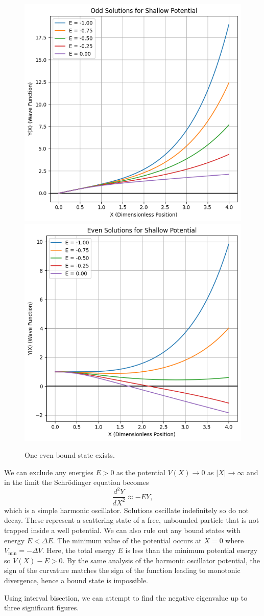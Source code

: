 \documentclass{article}
\begin{document}
\begin{figure}
    \centering
    \includegraphics[width=0.49\linewidth]{images/old_shallow.png}
    \includegraphics[width=0.49\linewidth]{images/even_shallow.png}
    \caption{One even bound state exists.}
\end{figure}

 We can exclude any energies \(E > 0\) as the potential \(V(X) \to 0\) as \(|X| \to \infty\) and in the limit the Schr\"odinger equation becomes
\[ \frac{d^2Y}{dX^2} \approx -E Y, \]
which is a simple harmonic oscillator. Solutions oscillate indefinitely so do not decay. These represent a scattering state of a free, unbounded particle that is not trapped inside a well potential. We can also rule out any bound states with energy \(E < \Delta E\). The minimum value of the potential occurs at \(X = 0\) where \(V_{\min} = -\Delta V\). Here, the total energy \(E\) is less than the minimum potential energy so \(V(X) - E > 0\). By the same analysis of the harmonic oscillator potential, the sign of the curvature matches the sign of the function leading to monotonic divergence, hence a bound state is impossible.

Using interval bisection, we can attempt to find the negative eigenvalue up to three significant figures.
\end{document}

